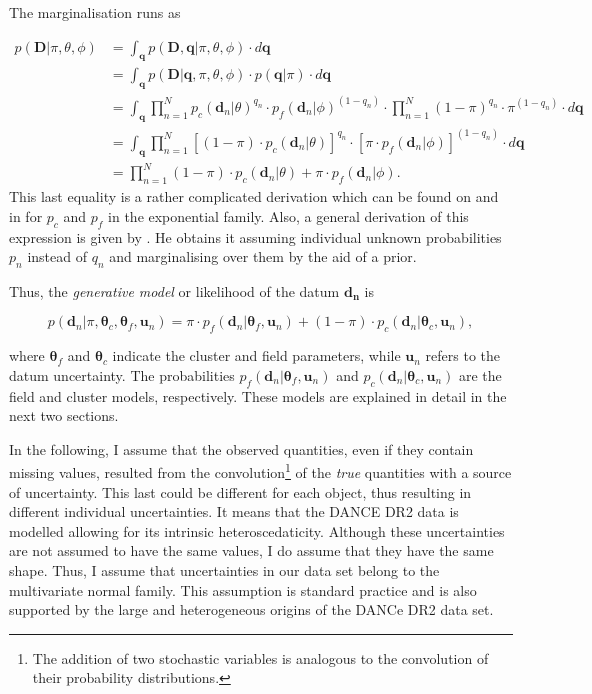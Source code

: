 The marginalisation runs as

\begin{align}
p(\mathbf{D}|\pi,\theta,\phi)&=\int_{\mathbf{q}} p(\mathbf{D},\mathbf{q}|\pi,\theta,\phi)\cdot d\mathbf{q} \nonumber \\
&=\int_{\mathbf{q}} p(\mathbf{D}|\mathbf{q},\pi,\theta,\phi)\cdot p(\mathbf{q}|\pi)\cdot d\mathbf{q} \nonumber \\
&=\int_{\mathbf{q}} \prod_{n=1}^N {p_c(\mathbf{d}_n|\theta)}^{q_n}\cdot {p_f(\mathbf{d}_n|\phi)}^{(1-q_n)}\cdot \prod_{n=1}^N {(1-\pi)}^{q_n}\cdot {\pi}^{(1-q_n)}\cdot d\mathbf{q} \nonumber \\
&=\int_{\mathbf{q}} \prod_{n=1}^N \left[(1-\pi)\cdot p_c(\mathbf{d}_n|\theta)\right]^{q_n}\cdot \left[\pi\cdot p_f(\mathbf{d}_n|\phi)\right]^{(1-q_n)}\cdot d\mathbf{q} \nonumber \\
&=\prod_{n=1}^N (1-\pi)\cdot p_c(\mathbf{d}_n|\theta) + \pi\cdot p_f(\mathbf{d}_n|\phi).
\end{align}
This last equality is a rather complicated derivation which can be found on \citet{Press1997} and in \citet{Hogg2010a} for $p_c$ and $p_f$ in the exponential family. Also, a general derivation of this expression is given by \citet{Jaynes2003}. He obtains it assuming individual unknown probabilities $p_n$ instead of $q_n$ and marginalising over them by the aid of a prior.

Thus, the \emph{generative model} or likelihood of the datum $\mathbf{d_n}$  is

\begin{equation}
\label{eq:genmod}
p(\mathbf{d}_n | \pi,\boldsymbol{\theta}_c,\boldsymbol{\theta}_f,\mathbf{u}_n)=\pi \cdot p_f(\mathbf{d}_n|\boldsymbol{\theta}_f,\mathbf{u}_n) + (1-\pi)\cdot p_c(\mathbf{d}_n| \boldsymbol{\theta}_c,\mathbf{u}_n),
\end{equation}

where $\boldsymbol{\theta}_f$ and $\boldsymbol{\theta}_c$ indicate the cluster and field parameters, while $\mathbf{u}_n$ refers to the datum uncertainty. The probabilities $p_f(\mathbf{d}_n|\boldsymbol{\theta}_f,\mathbf{u}_n)$ and $p_c(\mathbf{d}_n| \boldsymbol{\theta}_c,\mathbf{u}_n)$ are the field and cluster models, respectively. These models are explained in detail in the next two sections.

In the following, I assume that the observed quantities, even if they contain missing values, resulted from the convolution\footnote{The addition of two stochastic variables is analogous to the convolution of their probability distributions.} of the \emph{true} quantities with a source of uncertainty. This last could be different for each object, thus resulting in different individual uncertainties. It means that the DANCE DR2 data is modelled allowing for its intrinsic heteroscedaticity. Although these uncertainties are not assumed to have the same values, I do assume that they have the same shape. Thus, I assume that uncertainties in our data set belong to the multivariate normal family.  This assumption is standard practice and is also supported by the large and heterogeneous origins of the DANCe DR2 data set. 

